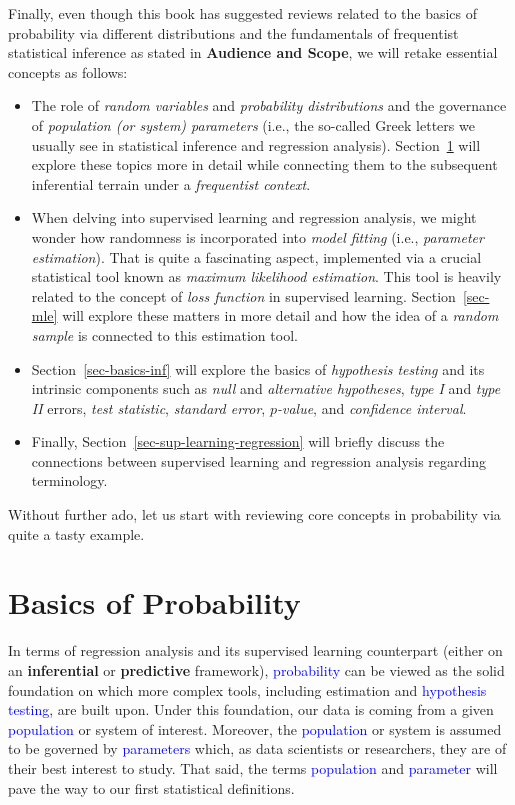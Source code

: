 \documentclass[
  letterpaper,
  DIV=11,
  numbers=noendperiod]{scrreprt}
\providecommand{\tightlist}{%
  \setlength{\itemsep}{0pt}\setlength{\parskip}{0pt}}\usepackage{longtable,booktabs,array}
\begin{document}
Finally, even though this book has suggested reviews related to the
basics of probability via different distributions and the fundamentals
of frequentist statistical inference as stated in \textbf{Audience and
Scope}, we will retake essential concepts as follows:

\begin{itemize}
\tightlist
\item
  The role of \emph{random variables} and \emph{probability
  distributions} and the governance of \emph{population (or system)
  parameters} (i.e., the so-called Greek letters we usually see in
  statistical inference and regression analysis).
  Section~\ref{sec-basics-prob} will explore these topics more in detail
  while connecting them to the subsequent inferential terrain under a
  \emph{frequentist context}.
\item
  When delving into supervised learning and regression analysis, we
  might wonder how randomness is incorporated into \emph{model fitting}
  (i.e., \emph{parameter estimation}). That is quite a fascinating
  aspect, implemented via a crucial statistical tool known as
  \emph{maximum likelihood estimation}. This tool is heavily related to
  the concept of \emph{loss function} in supervised learning.
  Section~\ref{sec-mle} will explore these matters in more detail and
  how the idea of a \emph{random sample} is connected to this estimation
  tool.
\item
  Section~\ref{sec-basics-inf} will explore the basics of
  \emph{hypothesis testing} and its intrinsic components such as
  \emph{null} and \emph{alternative hypotheses}, \emph{type I} and
  \emph{type II} errors, \emph{test statistic}, \emph{standard error},
  \emph{\(p\)-value}, and \emph{confidence interval}.
\item
  Finally, Section~\ref{sec-sup-learning-regression} will briefly
  discuss the connections between supervised learning and regression
  analysis regarding terminology.
\end{itemize}

Without further ado, let us start with reviewing core concepts in
probability via quite a tasty example.

\section{Basics of Probability}\label{sec-basics-prob}

In terms of regression analysis and its supervised learning counterpart
(either on an \textbf{inferential} or \textbf{predictive} framework),
\textcolor{blue}{probability} can be viewed as the solid foundation on
which more complex tools, including estimation and
\textcolor{blue}{hypothesis testing}, are built upon. Under this
foundation, our data is coming from a given \textcolor{blue}{population}
or system of interest. Moreover, the \textcolor{blue}{population} or
system is assumed to be governed by \textcolor{blue}{parameters} which,
as data scientists or researchers, they are of their best interest to
study. That said, the terms \textcolor{blue}{population} and
\textcolor{blue}{parameter} will pave the way to our first statistical
definitions.
\end{document}

